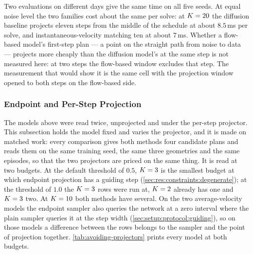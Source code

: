 Two evaluations on different days give the same time on all five seeds. At equal noise level the two
families cost about the same per solve: at $K=20$ the diffusion baseline projects eleven steps from
the middle of the schedule at about $8.5$\,ms per solve, and instantaneous-velocity matching ten at about
$7$\,ms. Whether a flow-based model's first-step plan --- a point on the straight path from noise to
data --- projects more cheaply than the diffusion model's at the same step is not measured here: at two
steps the flow-based window excludes that step. The measurement that would show it is the same cell with
the projection window opened to both steps on the flow-based side.

\subsubsection{Endpoint and Per-Step Projection}\label{sec:res:avoiding:projectors}

The models above were read twice, unprojected and under the per-step projector. This subsection holds the
model fixed and varies the projector, and it is made on matched work: every comparison gives both methods
four candidate plans and reads them on the same training seed, the same three geometries and the same
episodes, so that the two projectors are priced on the same thing. It is read at two budgets. At the
default threshold of $0.5$, $K=3$ is the smallest budget at which endpoint projection has a guiding step
(\autoref{sec:res:constraints:degenerate}); at the threshold of $1.0$ the $K=3$ rows were run at, $K=2$
already has one and $K=3$ two. At $K=10$ both methods have several. On the two average-velocity models the endpoint sampler also
queries the network at a zero interval where the plain sampler queries it at the step width
(\autoref{sec:setup:protocol:guiding}), so on those models a difference between the rows belongs to the
sampler and the point of projection together. \autoref{tab:avoiding-projectors} prints every model at both budgets.

